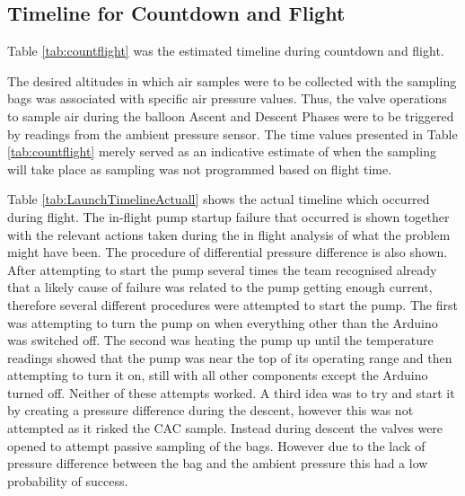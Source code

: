 \subsection{Timeline for Countdown and Flight}
Table \ref{tab:countflight} was the estimated timeline during countdown and flight. 

The desired altitudes in which air samples were to be collected with the sampling bags was associated with specific air pressure values. Thus, the valve operations to sample air during the balloon Ascent and Descent Phases were to be triggered by readings from the ambient pressure sensor. The time values presented in Table \ref{tab:countflight} merely served as an indicative estimate of when the sampling will take place as sampling was not programmed based on flight time.



Table \ref{tab:LaunchTimelineActuall} shows the actual timeline which occurred during flight. The in-flight pump startup failure that occurred is shown together with the relevant actions taken during the in flight analysis of what the problem might have been. The procedure of differential pressure difference is also shown. After attempting to start the pump several times the team recognised already that a likely cause of failure was related to the pump getting enough current, therefore several different procedures were attempted to start the pump. The first was attempting to turn the pump on when everything other than the Arduino was switched off. The second was heating the pump up until the temperature readings showed that the pump was near the top of its operating range and then attempting to turn it on, still with all other components except the Arduino turned off. Neither of these attempts worked. A third idea was to try and start it by creating a pressure difference during the descent, however this was not attempted as it risked the CAC sample. Instead during descent the valves were opened to attempt passive sampling of the bags. However due to the lack of pressure difference between the bag and the ambient pressure this had a low probability of success. 

\pagebreak
